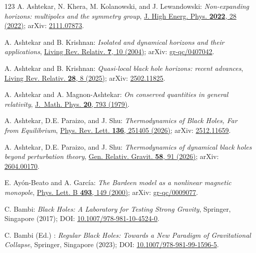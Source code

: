 \begin{thebibliography}{123}
A. Ashtekar, N. Khera, M. Kolanowski, and J. Lewandowski:
{\em Non-expanding horizons: multipoles and the symmetry group},
\href{https://doi.org/10.1007/JHEP01(2022)028}{J. High Energ. Phys. {\bf 2022}, 28 (2022)};
arXiv: \href{https://arxiv.org/abs/2111.07873}{2111.07873}.

A. Ashtekar and B. Krishnan:
{\em Isolated and dynamical horizons and their applications},
\href{https://doi.org/10.12942/lrr-2004-10}{Living Rev. Relativ. {\bf 7}, 10 (2004)};
arXiv: \href{https://arxiv.org/abs/gr-qc/0407042}{gr-qc/0407042}.

A. Ashtekar and B. Krishnan:
{\em Quasi-local black hole horizons: recent advances},
\href{https://doi.org/10.1007/s41114-025-00061-4}{Living Rev. Relativ. {\bf 28}, 8 (2025)};
arXiv: \href{https://arxiv.org/abs/2502.11825}{2502.11825}.

A. Ashtekar and A. Magnon-Ashtekar:
{\em On conserved quantities in general relativity},
\href{https://doi.org/10.1063/1.524151}{J.~Math. Phys. {\bf 20}, 793 (1979)}.

A. Ashtekar, D.E. Paraizo, and J. Shu:
{\em Thermodynamics of Black Holes, Far from Equilibrium},
\href{https://doi.org/10.1103/3c1r-v8f1}{Phys. Rev. Lett. {\bf 136}, 251405 (2026)};
arXiv: \href{https://arxiv.org/abs/2512.11659}{2512.11659}.

A. Ashtekar, D.E. Paraizo, and J. Shu:
{\em Thermodynamics of dynamical black holes beyond perturbation theory},
\href{https://doi.org/10.1007/s10714-026-03585-4}{Gen. Relativ. Gravit. {\bf 58}, 91 (2026)};
arXiv: \href{https://arxiv.org/abs/2604.00170}{2604.00170}.

E. Ayón-Beato and A. García:
{\em The Bardeen model as a nonlinear magnetic monopole},
\href{https://doi.org/10.1016/S0370-2693(00)01125-4}{Phys. Lett. B {\bf 493}, 149 (2000)};
arXiv: \href{https://arxiv.org/abs/gr-qc/0009077}{gr-qc/0009077}.

C. Bambi: {\em Black Holes: A Laboratory for Testing Strong Gravity},
Springer, Singapore (2017);
DOI: \href{https://doi.org/10.1007/978-981-10-4524-0}{10.1007/978-981-10-4524-0}.

C. Bambi (Ed.) : {\em Regular Black Holes: Towards a New Paradigm of Gravitational Collapse},
Springer, Singapore (2023);
DOI: \href{https://doi.org/10.1007/978-981-99-1596-5}{10.1007/978-981-99-1596-5}.


\end{thebibliography}

